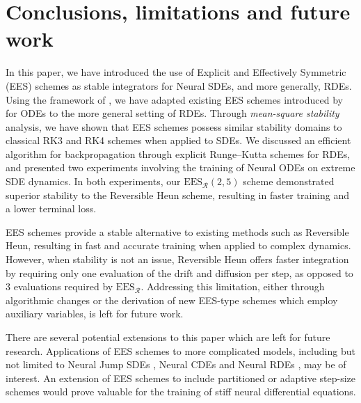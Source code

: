 \documentclass{article} %
\theoremstyle{definition}
\theoremstyle{remark}
\begin{document}
\section{Conclusions, limitations and future work}\label{sec:conclusion}

In this paper, we have introduced the use of Explicit and Effectively Symmetric (EES) schemes as stable integrators for Neural SDEs, and more generally, RDEs. Using the framework of \cite{redmann2020runge}, we have adapted existing EES schemes introduced by~\cite{shmelev2025explicit} for ODEs to the more general setting of RDEs. Through \emph{mean-square stability} analysis, we have shown that EES schemes possess similar stability domains to classical RK3 and RK4 schemes when applied to SDEs. We discussed an efficient algorithm for backpropagation through explicit Runge--Kutta schemes for RDEs, and presented two experiments involving the training of Neural ODEs on extreme SDE dynamics. In both experiments, our $\mathrm{EES}_\mathcal{R}(2,5)$ scheme demonstrated superior stability to the Reversible Heun scheme, resulting in faster training and a lower terminal loss.

EES schemes provide a stable alternative to existing methods such as Reversible Heun, resulting in fast and accurate training when applied to complex dynamics. However, when stability is not an issue, Reversible Heun offers faster integration by requiring only one evaluation of the drift and diffusion per step, as opposed to 3 evaluations required by $\mathrm{EES}_\mathcal{R}$. Addressing this limitation, either through algorithmic changes or the derivation of new EES-type schemes which employ auxiliary variables, is left for future work.

There are several potential extensions to this paper which are left for future research. Applications of EES schemes to more complicated models, including but not limited to Neural Jump SDEs \citep{jia2019neural, herrera2020neural}, Neural CDEs \citep{kidger2020neural} and Neural RDEs \citep{morrill2021neural}, may be of interest. An extension of EES schemes to include partitioned or adaptive step-size schemes would prove valuable for the training of stiff neural differential equations.




\end{document}
